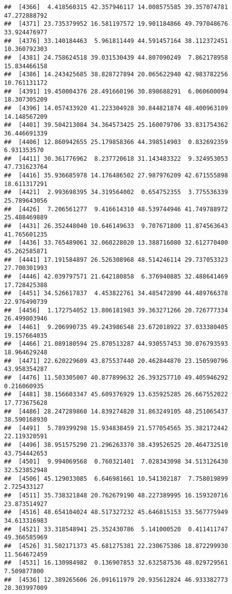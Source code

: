 \documentclass[
]{article}
\begin{document}
\begin{verbatim}
##  [4366]  4.418560315 42.357946117 14.008575585 39.357074781 47.272888792
##  [4371] 23.735379952 16.581197572 19.901184866 49.797048676 33.924476977
##  [4376] 33.140184463  5.961811449 44.591457164 38.112372451 10.360792303
##  [4381] 24.758624518 39.031530439 44.807090249  7.862178958 15.834466158
##  [4386] 14.243425685 38.828727894 20.065622940 42.983782256 10.761131172
##  [4391] 19.450004376 28.491660196 30.898688291  6.060600094 18.307305209
##  [4396] 14.057433920 41.223304928 30.844821874 48.400963109 14.148567209
##  [4401] 39.504213084 34.364573425 25.160079706 33.831754362 36.446691339
##  [4406] 12.860942655 25.179858366 44.398514903  0.832692359  6.931353570
##  [4411] 30.361776962  8.237720618 31.143483322  9.324953053 47.731623764
##  [4416] 35.936685978 14.176486502 27.987976209 42.671555898 18.611317291
##  [4421]  2.993698395 34.319564002  0.654752355  3.775536339 25.789643056
##  [4426]  7.206561277  9.416614310 48.539744946 41.749788972 25.488469889
##  [4431] 26.352448040 10.646149633  9.707671800 11.874563643 41.765601235
##  [4436] 33.765489061 32.060228020 13.388716080 32.612770400 45.262585871
##  [4441] 17.191584897 26.526308968 48.514246114 29.737053323 27.700301993
##  [4446] 42.039797571 21.642180858  6.376940885 32.488641469 17.728425388
##  [4451] 34.526617837  4.453822761 34.485472890 44.489766378 22.976490739
##  [4456]  1.172754052 13.806181983 39.363271266 20.726777334 26.499803946
##  [4461]  9.206990735 49.243986548 23.672018922 37.033380405 19.157664035
##  [4466] 21.089180594 25.870513287 44.930557453 30.076793593 18.964629248
##  [4471] 22.620229609 43.875537440 20.462844870 23.150590796 43.958354287
##  [4476] 11.503305007 40.877899632 26.393257710 49.405946292  0.216060935
##  [4481] 38.156603347 45.609376929 13.635925285 26.667552022 17.773675628
##  [4486] 28.247289860 14.839274820 31.863249105 48.251065437 38.590168930
##  [4491]  5.789399298 15.934838459 21.577054565 35.382172442 22.119320591
##  [4496] 38.951575290 21.296263370 38.439526525 20.464732510 43.754442653
##  [4501]  9.994069568  0.760321401  7.028343098 34.513126430 32.523852948
##  [4506] 45.129033085  6.646981661 10.541302187  7.758019899  2.725433127
##  [4511] 35.738321848 20.762679190 48.227389995 16.159320716 23.873514927
##  [4516] 48.654104024 48.517327232 45.646815153 33.567775949 34.613316983
##  [4521] 33.318548941 25.352430786  5.141000520  0.411411747 49.366585969
##  [4526] 31.502171373 45.681275381 22.230675386 18.872299930 11.564672459
##  [4531] 16.130984982  0.136907853 32.632587536 48.029729561  7.509877800
##  [4536] 12.389265606 26.091611979 20.935612824 46.933382773 28.303997009

\end{verbatim}
\end{document}
